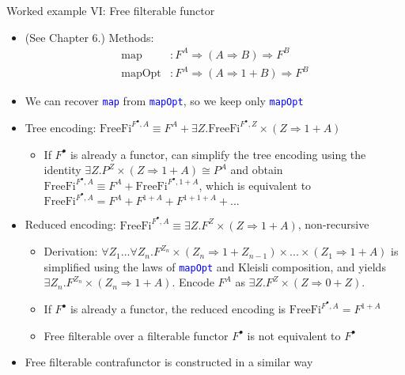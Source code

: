 \documentclass[english,,russian]{beamer}
\begin{document}
\begin{frame}{Worked example VI: Free filterable functor}
\begin{itemize}
\item (See Chapter 6.) Methods:
\begin{align*}
\text{map} & :F^{A}\Rightarrow\left(A\Rightarrow B\right)\Rightarrow F^{B}\\
\text{mapOpt} & :F^{A}\Rightarrow\left(A\Rightarrow1+B\right)\Rightarrow F^{B}
\end{align*}
\item We can recover \texttt{\textcolor{blue}{\footnotesize{}map}} from
\texttt{\textcolor{blue}{\footnotesize{}mapOpt}}, so we keep only
\texttt{\textcolor{blue}{\footnotesize{}mapOpt}} 
\item Tree encoding: $\text{FreeFi}^{F^{\bullet},A}\equiv F^{A}+\exists Z.\text{FreeFi}^{F^{\bullet},Z}\times\left(Z\Rightarrow1+A\right)$
\begin{itemize}
\item If $F^{\bullet}$ is already a functor, can simplify the tree encoding
using the identity $\exists Z.P^{Z}\times\left(Z\Rightarrow1+A\right)\cong P^{A}$
and obtain $\text{FreeFi}^{F^{\bullet},A}\equiv F^{A}+\text{FreeFi}^{F^{\bullet},1+A}$,
which is equivalent to $\text{FreeFi}^{F^{\bullet},A}=F^{A}+F^{1+A}+F^{1+1+A}+...$
\end{itemize}
\item Reduced encoding: $\text{FreeFi}^{F^{\bullet},A}\equiv\exists Z.F^{Z}\times\left(Z\Rightarrow1+A\right)$,
non-recursive
\begin{itemize}
\item {\footnotesize{}\vspace{-0.35cm}}Derivation: $\forall Z_{1}...\forall Z_{n}.F^{Z_{n}}\times\left(Z_{n}\Rightarrow1+Z_{n-1}\right)\times...\times\left(Z_{1}\Rightarrow1+A\right)$
is simplified using the laws of \texttt{\textcolor{blue}{\footnotesize{}mapOpt}}
and Kleisli composition, and yields $\exists Z_{n}.F^{Z_{n}}\times\left(Z_{n}\Rightarrow1+A\right)$.
Encode $F^{A}$ as $\exists Z.F^{Z}\times\left(Z\Rightarrow0+Z\right)$.
\item If $F^{\bullet}$ is already a functor, the reduced encoding is $\text{FreeFi}^{F^{\bullet},A}=F^{1+A}$
\item Free filterable over a filterable functor $F^{\bullet}$ is not equivalent
to $F^{\bullet}$
\end{itemize}
\item Free filterable contrafunctor is constructed in a similar way
\end{itemize}
\end{frame}
\end{document}
